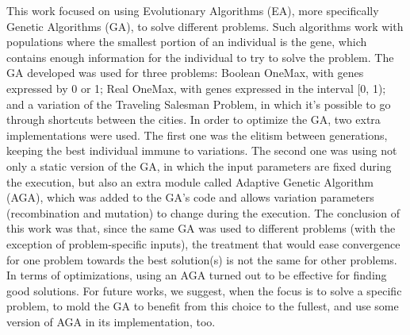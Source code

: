 This work focused on using Evolutionary Algorithms (EA), more specifically Genetic Algorithms (GA), to solve different problems. Such algorithms work with populations where the smallest portion of an individual is the gene, which contains enough information for the individual to try to solve the problem. The GA developed was used for three problems: Boolean OneMax, with genes expressed by 0 or 1; Real OneMax, with genes expressed in the interval [0, 1); and a variation of the Traveling Salesman Problem, in which it's possible to go through shortcuts between the cities. In order to optimize the GA, two extra implementations were used. The first one was the elitism between generations, keeping the best individual immune to variations. The second one was using not only a static version of the GA, in which the input parameters are fixed during the execution, but also an extra module called Adaptive Genetic Algorithm (AGA), which was added to the GA's code and allows variation parameters (recombination and mutation) to change during the execution. The conclusion of this work was that, since the same GA was used to different problems (with the exception of problem-specific inputs), the treatment that would ease convergence for one problem towards the best solution(s) is not the same for other problems. In terms of optimizations, using an AGA turned out to be effective for finding good solutions. For future works, we suggest, when the focus is to solve a specific problem, to mold the GA to benefit from this choice to the fullest, and use some version of AGA in its implementation, too.
